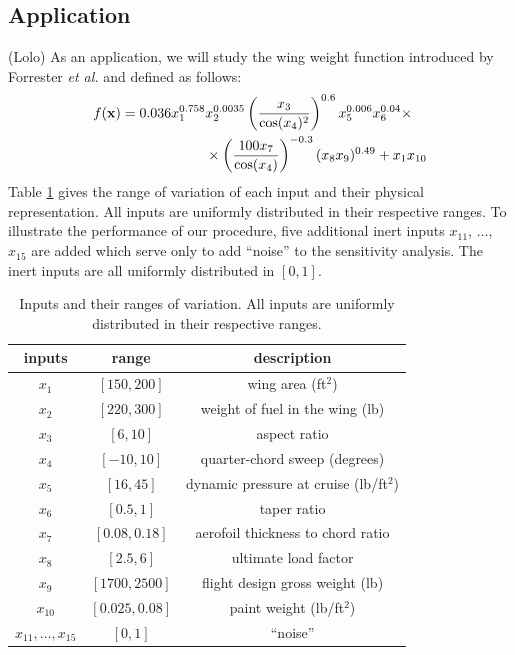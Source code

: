 {\color{purple}
\subsection{Application}
\label{sec:5.2}

(Lolo) As an application, we will study the wing weight function introduced by Forrester \textit{et al.} \cite{Forrester} and defined as follows:
\begin{align*}
f(\boldsymbol{\mathbf{x}})=0.036 x_1^{0.758} & x_2^{0.0035} \left(\frac{x_3}{\cos(x_4)^2}\right)^{0.6} x_5^{0.006} x_6^{0.04}\times \\
 & \times\left(\frac{100 x_7}{\cos(x_4)}\right)^{-0.3} (x_8 x_9)^{0.49} + x_1 x_{10}
\end{align*}
Table \ref{wing_inputs_table} gives the range of variation of each input and their physical representation.  All inputs are uniformly distributed in their respective ranges. To illustrate the performance of our procedure, five additional inert inputs $x_{11}$, $\dots$, $x_{15}$ are added which serve only to add ``noise'' to the sensitivity analysis. The inert inputs are all uniformly distributed in $[0,1]$.
\begin{table}[!ht]
\caption{Inputs and their ranges of variation. All inputs are uniformly distributed in their respective ranges.}
\centering
\begin{tabular}{ccc}
\hline
 inputs & range & description \\ \hline
$x_1$ & $[150, 200]$ & wing area (ft$^2$) \\
$x_2$ & $[220, 300]$ & weight of fuel in the wing (lb) \\
$x_3$ & $[6, 10]$ & aspect ratio \\
$x_4$ & $[-10, 10]$ & quarter-chord sweep (degrees) \\
$x_5$ & $[16, 45]$ & dynamic pressure at cruise (lb/ft$^2$) \\
$x_6$ & $[0.5, 1]$ & taper ratio \\
$x_7$ & $[0.08, 0.18]$ & aerofoil thickness to chord ratio \\
$x_8$ & $[2.5, 6]$ & ultimate load factor \\
$x_9$ & $[1700, 2500]$ & flight design gross weight (lb) \\
$x_{10}$ & $[0.025, 0.08]$ & paint weight (lb/ft$^2$) \\
$x_{11},\dots,x_{15}$ & $[0,1]$ & ``noise'' \\
\hline
\end{tabular}
\label{wing_inputs_table}
\end{table}

}
